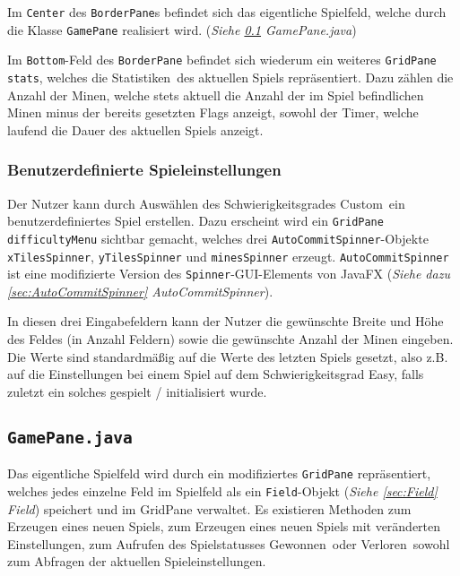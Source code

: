 \documentclass[oneside,12pt]{scrartcl}
\newcommand*{\EnableHyphenationInTexttt}{\hyphenchar\font=45\relax}%
\newcommand{\class}[1]{\textcolor{Green4}{\bcode{#1}}}
\newcommand{\attribute}[1]{\textcolor{SkyBlue3}{\bcode{#1}}}
\newcommand{\classattribute}[2]{\class{#1} \attribute{#2}}
\newcommand{\bcode}[1]{\texttt{\EnableHyphenationInTexttt#1}}
\begin{document}
Im \attribute{Center} des \class{BorderPane}s befindet sich das eigentliche Spielfeld, welche durch die Klasse \class{GamePane} realisiert wird. (\textit{Siehe \ref{sec:GamePane} GamePane.java})

Im \attribute{Bottom}-Feld des \class{BorderPane} befindet sich wiederum ein weiteres \classattribute{GridPane}{stats}, welches die \glqq Statistiken\grqq\ des aktuellen Spiels repräsentiert. Dazu zählen die Anzahl der Minen, welche stets aktuell die Anzahl der im Spiel befindlichen Minen minus der bereits gesetzten Flags anzeigt, sowohl der Timer, welche laufend die Dauer des aktuellen Spiels anzeigt.

\subsubsection{Benutzerdefinierte Spieleinstellungen}
Der Nutzer kann durch Auswählen des Schwierigkeitsgrades \glqq Custom\grqq\ ein benutzerdefiniertes Spiel erstellen. Dazu erscheint wird ein \attribute{GridPane difficultyMenu} sichtbar gemacht, welches drei \attribute{AutoCommitSpinner}-Objekte \attribute{xTilesSpinner}, \attribute{yTilesSpinner} und \attribute{minesSpinner} erzeugt. \class{AutoCommitSpinner} ist eine modifizierte Version des \class{Spinner}-GUI-Elements von JavaFX (\textit{Siehe dazu \ref{sec:AutoCommitSpinner} AutoCommitSpinner}).

In diesen drei Eingabefeldern kann der Nutzer die gewünschte Breite und Höhe des Feldes (in Anzahl Feldern) sowie die gewünschte Anzahl der Minen eingeben. Die Werte sind standardmäßig auf die Werte des letzten Spiels gesetzt, also z.B. auf die Einstellungen bei einem Spiel auf dem Schwierigkeitsgrad \glqq Easy\grqq, falls zuletzt ein solches gespielt / initialisiert wurde.

\subsection{\class{GamePane.java}}
\label{sec:GamePane}
Das eigentliche Spielfeld wird durch ein modifiziertes \class{GridPane} repräsentiert, welches jedes einzelne Feld im Spielfeld als ein \class{Field}-Objekt (\textit{Siehe \ref{sec:Field} Field}) speichert und im GridPane verwaltet. Es existieren Methoden zum Erzeugen eines neuen Spiels, zum Erzeugen eines neuen Spiels mit veränderten Einstellungen, zum Aufrufen des Spielstatusses \glqq Gewonnen\grqq\ oder \glqq Verloren\grqq\ sowohl zum Abfragen der aktuellen Spieleinstellungen.
\end{document}
